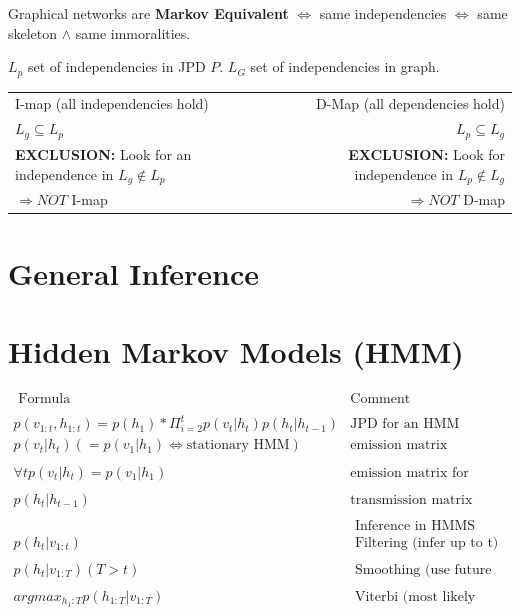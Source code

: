 \documentclass[a4paper,10pt]{article}
\begin{document}
Graphical networks are \textbf{Markov Equivalent} $\iff$ same independencies $\iff$ same skeleton $\wedge$ same immoralities.

$L_p$ set of independencies in JPD $P$.
$L_G$ set of independencies in graph.

\begin{tabular}{l||r}
 I-map (all independencies hold)  & D-Map (all dependencies hold) \\
 $L_g \subseteq L_p$ &  $L_p \subseteq L_g$ \\
 \textbf{EXCLUSION:} Look for an independence in $L_g \notin L_p$ & \textbf{EXCLUSION:} Look for independence in $L_p \notin L_g$ \\
 $\Rightarrow NOT$ I-map & $\Rightarrow NOT$ D-map \\
\end{tabular}

\section{General Inference}

\section{Hidden Markov Models (HMM)}
$$\begin{array}{l|c}
    \textrm{ Formula} & \textrm{Comment}  \\ 
    \\
    p(v_{1:t}, h_{1:t}) = p(h_1) * \Pi^{t}_{i=2} p(v_t|h_t) p(h_t| h_{t-1}) & \textrm{JPD for an HMM}
    \\
    p(v_t | h_t) (= p(v_1 | h_1) \iff \textrm{stationary HMM})   & \textrm{emission matrix} \\
    \\
    \forall t p(v_t | h_t) = p(v_1 | h_1)    & \textrm{emission matrix for stationary HMM} \\
    \\
    p(h_t | h_{t-1})  & \textrm{transmission matrix}  \\
    \\
     & \textrm{ Inference in HMMS} \\
    p(h_t | v_{1:t}) & \textrm{ Filtering (infer up to t)} \\
    \\
    p(h_t | v_{1:T}) (T > t) & \textrm{ Smoothing (use future too)} \\
    \\
    argmax_{h_1:T} p(h_{1:T} | v_{1:T}) & \textrm{ Viterbi (most likely state)} \\
    \\
  \end{array}
$$
\end{document}
